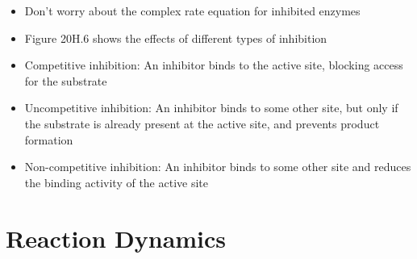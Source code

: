 \documentclass[12pt, openany, letterpaper]{memoir}
\begin{document}
\begin{itemize}
\begin{itemize}
		      \item Don't worry about the complex rate equation for inhibited enzymes
		      \item Figure 20H.6 shows the effects of different types of inhibition
		      \item Competitive inhibition: An inhibitor binds to the active site, blocking access for the substrate
		      \item Uncompetitive inhibition: An inhibitor binds to some other site, but only if the substrate is already present at the active site, and prevents product formation
		      \item Non-competitive inhibition: An inhibitor binds to some other site and reduces the binding activity of the active site
	      \end{itemize}
\end{itemize}

\chapter{Reaction Dynamics}
\end{document}
